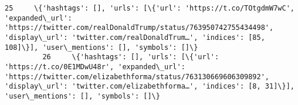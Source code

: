 \documentclass[11pt]{article}
\begin{document}
\begin{Verbatim}[commandchars=\\\{\}]
         25     \{'hashtags': [], 'urls': [\{'url': 'https://t.co/TOtgdmW7wC', 'expanded\_url': 'https://twitter.com/realDonaldTrump/status/763950742755434498', 'display\_url': 'twitter.com/realDonaldTrum…', 'indices': [85, 108]\}], 'user\_mentions': [], 'symbols': []\}                                                                                                                                                                                                                                                                                                                                                                                                                                                                                                                                                                                                                                                                                                                                                                                                                                                                                                                                                        
         26     \{'hashtags': [], 'urls': [\{'url': 'https://t.co/0E1MDwU48r', 'expanded\_url': 'https://twitter.com/elizabethforma/status/763130669606309892', 'display\_url': 'twitter.com/elizabethforma…', 'indices': [8, 31]\}], 'user\_mentions': [], 'symbols': []\}                                                                                                                                                                                                                                                                                                                                                                                                                                                                                                                                                                                                                                                                                                                                                                                                                                                                                                                                                           

\end{Verbatim}
\end{document}
